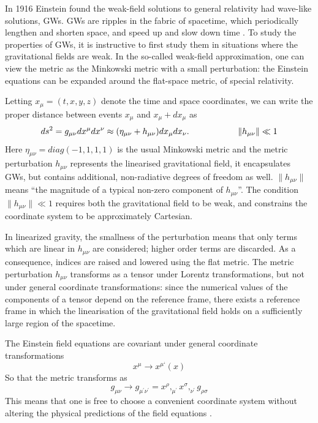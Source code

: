 \documentclass[binding=0.6cm, LaM]{sapthesis}
\begin{document}
	In 1916 Einstein found the weak-field solutions to general relativity had wave-like solutions, GWs.
	GWs are ripples in the fabric of spacetime, 
	which periodically lengthen and shorten space, and speed up and slow down time \cite{2}.
 	To study the properties of GWs, it is instructive to first study them 
	in situations where the gravitational fields are weak.
	In the so-called weak-field approximation, one can view the metric as the Minkowski metric 
	with a small perturbation: the Einstein equations can be expanded around the flat-space metric, of special relativity.

	Letting $ x_\mu = (t, x, y, z)$ denote the time and space coordinates, 
	we can write the proper distance between events $x_{\mu}$ and $x_{\mu} + dx_{\mu}$ as
		\[
		ds^2 = g_{\mu\nu}dx^{\mu}dx^{\nu} \approx (\eta_{\mu\nu} + h_{\mu\nu})dx_{\mu}dx_{\nu}. \hspace*{2cm}\|h_{\mu\nu}\|\ll 1
		\]
	Here $\eta_{\mu\nu} = diag(-1,1,1,1)$ is the usual Minkowski metric and the metric perturbation  $h_{\mu\nu}$        
	represents the linearised gravitational field, it encapsulates GWs, 
	but contains additional, non-radiative degrees of freedom as well. $\|h_{\mu\nu}\|$ means
	“the magnitude of a typical non-zero component of $h_{\mu\nu}$”. 
	The condition $\|h_{\mu\nu}\|\ll 1$ requires both the gravitational field to be weak, 
	and constrains the coordinate system to be approximately Cartesian.

	In linearized gravity, the smallness of the perturbation means that only terms which are linear in $h_{\mu\nu}$ are considered;
	higher order terms are discarded. As a consequence, indices are raised and lowered using the flat metric. 
	The metric perturbation $h_{\mu\nu}$ transforms as a tensor under Lorentz transformations, 
	but not under general coordinate transformations: since the numerical values of the components
	of a tensor depend on the reference frame, there exists a reference frame in which 
	the linearisation of the gravitational field holds on a sufficiently large region of the spacetime.
        
	The Einstein field equations are covariant under general coordinate transformations
		\begin{equation}
		x^{\mu} \rightarrow x^{\mu ‘}(x)
		\end{equation}
	So that the metric transforms as
		\begin{equation}
		g_{\mu\nu} \rightarrow g_{\mu^\prime\nu^\prime} = x^{\rho},_{\mu^\prime}x^{\sigma},_{\nu^\prime}g_{\rho \sigma}
		\end{equation}
	This means that one is free to choose a convenient coordinate system without 
	altering the physical predictions of the field equations \cite{16}.
\end{document}
